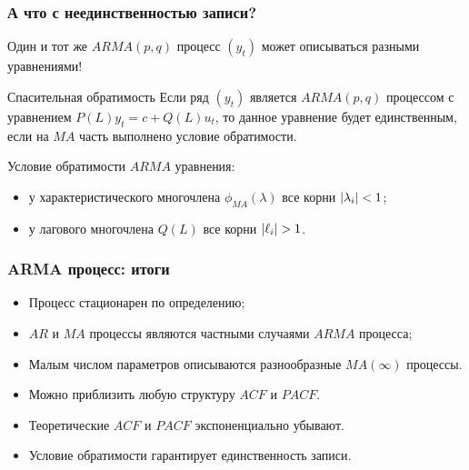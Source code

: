 \begin{frame}
  \frametitle{А что с неединственностью записи?}

  Один и тот же $ARMA(p, q)$ процесс $(y_t)$ может описываться разными уравнениями!
  \pause

  \begin{block}{Спасительная обратимость}
      Если ряд $(y_t)$ является $ARMA(p, q)$ процессом с уравнением $P(L) y_t = c + Q(L) u_t$, 
      то данное уравнение будет единственным, если на $MA$ часть выполнено условие обратимости. 
  \end{block}

  \pause
  Условие обратимости $ARMA$ уравнения:
  \begin{itemize}
    \item у характеристического многочлена $\phi_{MA}(\lambda)$ все корни $\abs{\lambda_i} <1$;
    \item у лагового многочлена $Q(L)$ все корни $\abs{\ell_i} >1$.
  \end{itemize}


\end{frame}



\begin{frame}
  \frametitle{ARMA процесс: итоги}
  \begin{itemize}[<+->]
    \item Процесс стационарен по \alert{определению};
    \item $AR$ и $MA$ процессы являются \alert{частными случаями} $ARMA$ процесса;
    \item \alert{Малым числом параметров} описываются разнообразные $MA(\infty)$ процессы. 
    \item Можно \alert{приблизить} любую структуру $ACF$ и $PACF$.
    \item Теоретические $ACF$ и $PACF$ \alert{экспоненциально} убывают.
   \item Условие обратимости гарантирует \alert{единственность записи}. 
  \end{itemize}

\end{frame}



